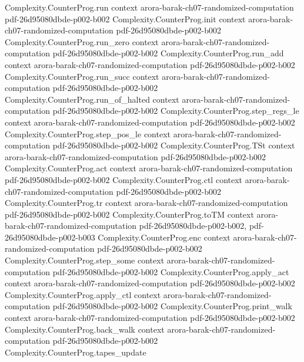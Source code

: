 \begin{theorem}
\proofstep
  {Complexity.CounterProg.run}
  {context}
  {arora-barak-ch07-randomized-computation}
  {pdf-26d95080dbde-p002-b002}
\proofstep
  {Complexity.CounterProg.init}
  {context}
  {arora-barak-ch07-randomized-computation}
  {pdf-26d95080dbde-p002-b002}
\proofstep
  {Complexity.CounterProg.run_zero}
  {context}
  {arora-barak-ch07-randomized-computation}
  {pdf-26d95080dbde-p002-b002}
\proofstep
  {Complexity.CounterProg.run_add}
  {context}
  {arora-barak-ch07-randomized-computation}
  {pdf-26d95080dbde-p002-b002}
\proofstep
  {Complexity.CounterProg.run_succ}
  {context}
  {arora-barak-ch07-randomized-computation}
  {pdf-26d95080dbde-p002-b002}
\proofstep
  {Complexity.CounterProg.run_of_halted}
  {context}
  {arora-barak-ch07-randomized-computation}
  {pdf-26d95080dbde-p002-b002}
\proofstep
  {Complexity.CounterProg.step_regs_le}
  {context}
  {arora-barak-ch07-randomized-computation}
  {pdf-26d95080dbde-p002-b002}
\proofstep
  {Complexity.CounterProg.step_pos_le}
  {context}
  {arora-barak-ch07-randomized-computation}
  {pdf-26d95080dbde-p002-b002}
\proofstep
  {Complexity.CounterProg.TSt}
  {context}
  {arora-barak-ch07-randomized-computation}
  {pdf-26d95080dbde-p002-b002}
\proofstep
  {Complexity.CounterProg.act}
  {context}
  {arora-barak-ch07-randomized-computation}
  {pdf-26d95080dbde-p002-b002}
\proofstep
  {Complexity.CounterProg.ctl}
  {context}
  {arora-barak-ch07-randomized-computation}
  {pdf-26d95080dbde-p002-b002}
\proofstep
  {Complexity.CounterProg.tr}
  {context}
  {arora-barak-ch07-randomized-computation}
  {pdf-26d95080dbde-p002-b002}
\proofstep
  {Complexity.CounterProg.toTM}
  {context}
  {arora-barak-ch07-randomized-computation}
  {pdf-26d95080dbde-p002-b002,
    pdf-26d95080dbde-p002-b003}
\proofstep
  {Complexity.CounterProg.enc}
  {context}
  {arora-barak-ch07-randomized-computation}
  {pdf-26d95080dbde-p002-b002}
\proofstep
  {Complexity.CounterProg.step_some}
  {context}
  {arora-barak-ch07-randomized-computation}
  {pdf-26d95080dbde-p002-b002}
\proofstep
  {Complexity.CounterProg.apply_act}
  {context}
  {arora-barak-ch07-randomized-computation}
  {pdf-26d95080dbde-p002-b002}
\proofstep
  {Complexity.CounterProg.apply_ctl}
  {context}
  {arora-barak-ch07-randomized-computation}
  {pdf-26d95080dbde-p002-b002}
\proofstep
  {Complexity.CounterProg.print_walk}
  {context}
  {arora-barak-ch07-randomized-computation}
  {pdf-26d95080dbde-p002-b002}
\proofstep
  {Complexity.CounterProg.back_walk}
  {context}
  {arora-barak-ch07-randomized-computation}
  {pdf-26d95080dbde-p002-b002}
\proofstep
  {Complexity.CounterProg.tapes_update}

\end{theorem}
